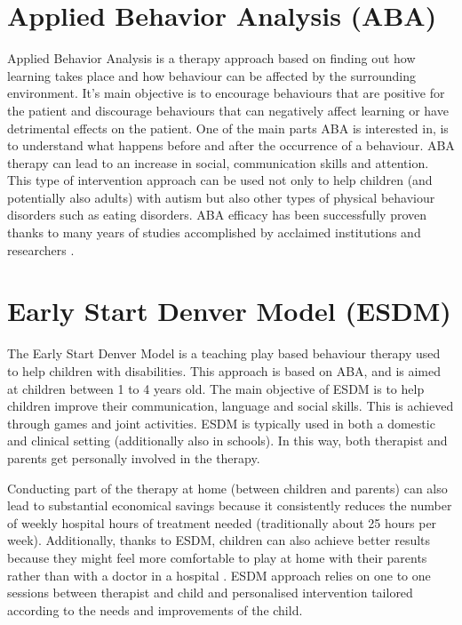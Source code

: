 \section{Applied Behavior Analysis (ABA)}

Applied Behavior Analysis is a therapy approach based on finding out how learning takes place and how behaviour can be affected by the surrounding environment. It's main objective is to encourage behaviours that are positive for the patient and discourage behaviours that can negatively affect learning or have detrimental effects on the patient. One of the main parts ABA is interested in, is to understand what happens before and after the occurrence of a behaviour. ABA therapy can lead to an increase in social, communication skills and attention. This type of intervention approach can be used not only to help children (and potentially also adults) with autism but also other types of physical behaviour disorders such as eating disorders. ABA efficacy has been successfully proven thanks to many years of studies accomplished by acclaimed institutions and researchers \cite{ABA}. 

\section{Early Start Denver Model (ESDM)}

The Early Start Denver Model is a teaching play based behaviour therapy used to help children with disabilities. This approach is based on ABA, and is aimed at children between 1 to 4 years old. The main objective of ESDM is to help children improve their communication, language and social skills. This is achieved through games and joint activities. ESDM is typically used in both a domestic and clinical setting (additionally also in schools). In this way, both therapist and parents get personally involved in the therapy. 

Conducting part of the therapy at home (between children and parents) can also lead to substantial economical savings because it consistently reduces the number of weekly hospital hours of treatment needed (traditionally about 25 hours per week). Additionally, thanks to ESDM, children can also achieve better results because they might feel more comfortable to play at home with their parents rather than with a doctor in a hospital \cite{parents}. ESDM approach relies on one to one sessions between therapist and child and personalised intervention tailored according to the needs and improvements of the child. 

